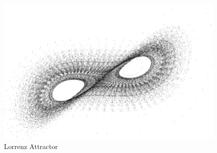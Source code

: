 
\maketitle


\begin{figure}[h]
	\centering
	\includegraphics[width=1.1\linewidth]{lorenzattractor2}
	\caption{Lorrenz Attractor}
	\label{fig:waveinterference}
\end{figure}